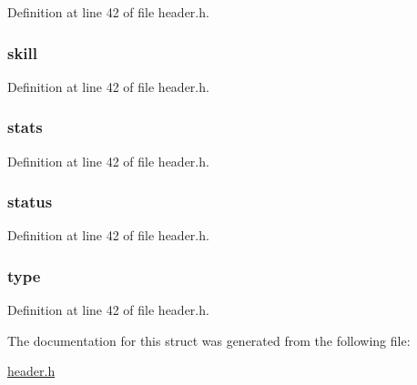 Definition at line 42 of file header.\-h.

\hypertarget{structt__character_ae7aa14804e69b1bc9652c16261da0c9f}{
\subsubsection[{skill}]{ skill}}\label{structt__character_ae7aa14804e69b1bc9652c16261da0c9f}


Definition at line 42 of file header.\-h.

\hypertarget{structt__character_a29711825af64d428d19df366a5056670}{
\subsubsection[{stats}]{ stats}}\label{structt__character_a29711825af64d428d19df366a5056670}


Definition at line 42 of file header.\-h.

\hypertarget{structt__character_a3ade6b90793e915ca28b52fb70e58e3f}{
\subsubsection[{status}]{ status}}\label{structt__character_a3ade6b90793e915ca28b52fb70e58e3f}


Definition at line 42 of file header.\-h.

\hypertarget{structt__character_a3b5fecb9824668aab778f82005089942}{
\subsubsection[{type}]{ type}}\label{structt__character_a3b5fecb9824668aab778f82005089942}


Definition at line 42 of file header.\-h.



The documentation for this struct was generated from the following file\-:\begin{DoxyCompactItemize}
\item 
\hyperlink{header_8h}{header.\-h}\end{DoxyCompactItemize}
